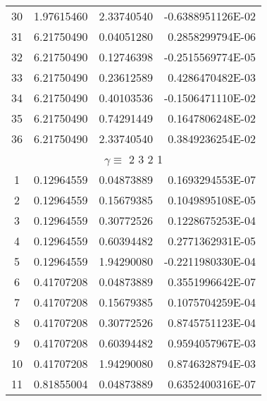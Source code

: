 \begin{longtable}{@{\extracolsep{\fill}}cllr@{}}
30  &  1.97615460  &  2.33740540  &  -0.6388951126E-02 \\

31  &  6.21750490  &  0.04051280  &   0.2858299794E-06 \\

32  &  6.21750490  &  0.12746398  &  -0.2515569774E-05 \\

33  &  6.21750490  &  0.23612589  &   0.4286470482E-03 \\

34  &  6.21750490  &  0.40103536  &  -0.1506471110E-02 \\

35  &  6.21750490  &  0.74291449  &   0.1647806248E-02 \\

36  &  6.21750490  &  2.33740540  &   0.3849236254E-02 \\

\midrule

\multicolumn{4}{c}{ $\gamma \equiv $  2 3 2 1} \\

\midrule

1  &  0.12964559  &  0.04873889  &   0.1693294553E-07 \\

2  &  0.12964559  &  0.15679385  &   0.1049895108E-05 \\

3  &  0.12964559  &  0.30772526  &   0.1228675253E-04 \\

4  &  0.12964559  &  0.60394482  &   0.2771362931E-05 \\

5  &  0.12964559  &  1.94290080  &  -0.2211980330E-04 \\

6  &  0.41707208  &  0.04873889  &   0.3551996642E-07 \\

7  &  0.41707208  &  0.15679385  &   0.1075704259E-04 \\

8  &  0.41707208  &  0.30772526  &   0.8745751123E-04 \\

9  &  0.41707208  &  0.60394482  &   0.9594057967E-03 \\

10  &  0.41707208  &  1.94290080  &   0.8746328794E-03 \\

11  &  0.81855004  &  0.04873889  &   0.6352400316E-07 \\


\end{longtable}
